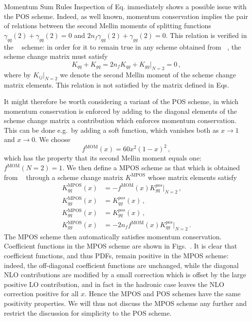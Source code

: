 \documentclass[9pt]{beamer}
\DeclareMathOperator{\msbar}{\overline{MS}}
\DeclareMathOperator{\mpos}{MPOS}
\begin{document}
\begin{frame}{Momentum Sum Rules}
    Inspection of Eq. immediately shows a possible issue
    with the POS scheme. Indeed, as well known, momentum conservation
    implies the pair of relations between the second Mellin moments of splitting
    functions $\gamma_{qq}(2)+\gamma_{gq}(2)=0$ and
     $2n_f\gamma_{qg}(2)+\gamma_{gg}(2)=0$. This relation is verified in the
    $\msbar$ scheme:  in order for it to remain true  in any scheme obtained
    from $\msbar$, the scheme change matrix must satisfy
    \begin{equation}\label{eq:momcons}
      K_{qq}+K_{gq}=2n_fK_{qg}+K_{gg}\Big|_{N=2}=0 \,,
    \end{equation}
    where by $K_{ij}\Big|_{N=2}$ we denote the second Mellin moment of the
    scheme change matrix elements. This relation is not satisfied by the matrix defined in
    Eqs.

    It might therefore be worth considering a variant of the POS scheme,
    in which momentum conservation is enforced by adding to the diagonal
    elements of the scheme change matrix a contribution which enforces
    momentum conservation. This can be done e.g.\ by adding a soft
    function, which vanishes both as $x\to1$ and $x \to0$. We choose
    \begin{equation}\label{eq:fmom}
      f^{\text{MOM}}(x)= 60 x^2(1-x)^2\,,
    \end{equation}
    which has the property that its second Mellin moment equals one:
    $f^{\text{MOM}}(N=2)=1$. We then define a MPOS scheme as that which is obtained
    from $\msbar$ through a scheme change matrix $K^{\mpos}$ whose
    matrix elements satisfy
    \begin{align}
      \label{eq:mposqq}
      K^{\mpos}_{qq}(x)&= - f^{\text{MOM}}(x) K^{pos}_{gq}\Big|_{N=2} \,,\\
      \label{eq:mposqg}
      K^{\mpos}_{qg}(x)&= K^{pos}_{qg}(x) \,,\\
      \label{eq:mposgq}
      K^{\mpos}_{gq}(x)&= K^{pos}_{gq}(x) \,,\\
      \label{eq:mposgg}
      K^{\mpos}_{gg}(x)&= -2n_f f^{\text{MOM}}(x) K^{pos}_{qg}\Big|_{N=2} \,.
    \end{align}
    The MPOS scheme then automatically satisfies momentum
    conservation. Coefficient functions in the MPOS scheme are shown in
    Figs.~. It is clear that coefficient
    functions, and thus PDFs, remain
    positive in the MPOS scheme: indeed, the off-diagonal coefficient
    functions are unchanged, while the diagonal NLO contributions are
    modified by a small correction which is offset by the large positive
    LO contribution, and in fact in the hadronic case leaves the NLO
    correction positive for all $x$. Hence the MPOS and POS schemes have the same
    positivity properties. We will thus not discuss the MPOS scheme
    any further and restrict the discussion for simplicity to the POS
    scheme.
\end{frame}
\end{document}
